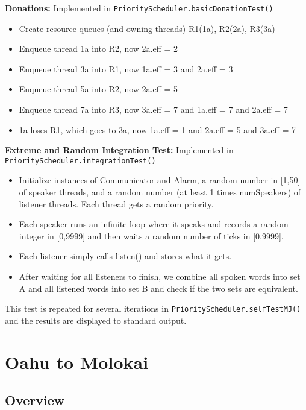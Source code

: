 \documentclass{article}
\begin{document}
\noindent\textbf{Donations:}
Implemented in \texttt{PriorityScheduler.basicDonationTest()}
\begin{itemize}
\item Create resource queues (and owning threads) R1(1a), R2(2a), R3(3a)
\item Enqueue thread 1a into R2, now 2a.eff = 2
\item Enqueue thread 3a into R1, now 1a.eff = 3 and 2a.eff = 3
\item Enqueue thread 5a into R2, now 2a.eff = 5
\item Enqueue thread 7a into R3, now 3a.eff = 7 and 1a.eff = 7 and 2a.eff = 7
\item 1a loses R1, which goes to 3a, now 1a.eff = 1 and 2a.eff = 5 and 3a.eff = 7
\end{itemize}

\noindent\textbf{\textcolor{\changecolor}{Extreme and Random Integration Test:}}
Implemented in \texttt{PriorityScheduler.integrationTest()}
\begin{itemize}
\item Initialize instances of Communicator and Alarm, a random number in [1,50] of speaker threads, and a random number (at least 1 times numSpeakers) of listener threads. Each thread gets a random priority.
\item Each speaker runs an infinite loop where it speaks and records a random integer in [0,9999] and then waits a random number of ticks in [0,9999].
\item Each listener simply calls listen() and stores what it gets.
\item After waiting for all listeners to finish, we combine all spoken words into set A and all listened words into set B and check if the two sets are equivalent.
\end{itemize}
This test is repeated for several iterations in \texttt{PriorityScheduler.selfTestMJ()} and the results are displayed to standard output.

\section{Oahu to Molokai}

\subsection{Overview}
\end{document}
